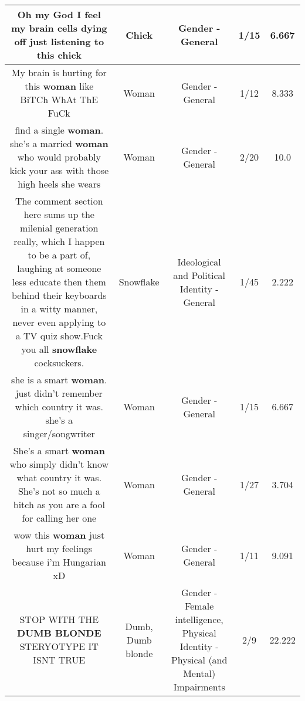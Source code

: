 \documentclass[11pt]{article}
\newlength\mylength
\begin{document}
\begin{center}
\begin{longtable}{|C{.65\mylength}|C{.30\mylength}|C{.12\mylength}|C{.12\mylength}|C{.12\mylength}|}
  \small Oh my God I feel my brain cells dying off just listening to this chick\normalsize   & Chick & Gender - General & 1/15 & 6.667 \\  \hline
  \small My brain is hurting for this \textbf{woman} like BiTCh WhAt ThE FuCk\normalsize   & Woman & Gender - General & 1/12 & 8.333 \\  \hline
  \small find a single \textbf{woman}. she's a married \textbf{woman} who would probably kick your ass with those high heels she wears\normalsize   & Woman & Gender - General & 2/20 & 10.0 \\  \hline
  \small The comment section here sums up the milenial generation really, which I happen to be a part of, laughing at someone less educate then them behind their keyboards in a witty manner, never even applying to a TV quiz show.Fuck you all \textbf{snowflake} cocksuckers.\normalsize   & Snowflake &  Ideological and Political Identity - General & 1/45 & 2.222 \\  \hline
  \small she is a smart \textbf{woman}. just didn't remember which country it was. she's a singer/songwriter\normalsize   & Woman & Gender - General & 1/15 & 6.667 \\  \hline
  \small She's a smart \textbf{woman} who simply didn't know what country it was. She's not so much a bitch as you are a fool for calling her one\normalsize   & Woman & Gender - General & 1/27 & 3.704 \\  \hline
  \small wow this \textbf{woman} just hurt my feelings because i'm Hungarian xD\normalsize   & Woman & Gender - General & 1/11 & 9.091 \\  \hline
  \small STOP WITH THE \textbf{D\textbf{UMB} BLONDE} STERYOTYPE IT ISNT TRUE\normalsize   & Dumb, Dumb blonde & Gender - Female intelligence, Physical Identity - Physical (and Mental) Impairments & 2/9 & 22.222 \\  \hline

\end{longtable}
\end{center}
\end{document}
